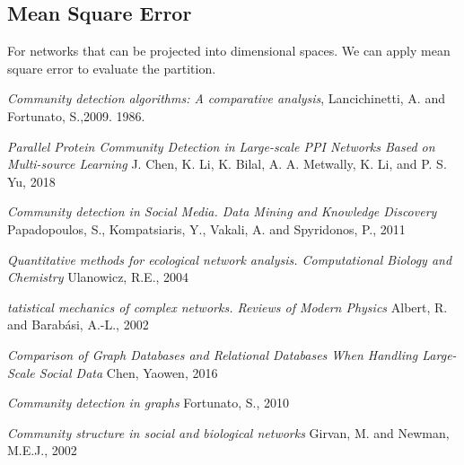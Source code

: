 \documentclass[12pt]{article}
\begin{document}
\subsection{Mean Square Error}
For networks that can be projected into dimensional spaces. We can apply mean square error to evaluate the partition.



\pagebreak
\begin{thebibliography}{100}

  
    \textit{Community detection algorithms: A comparative analysis},
    Lancichinetti, A. and Fortunato, S.,2009.
    1986.
  
    \textit{Parallel Protein Community Detection in
    Large-scale PPI Networks Based on
    Multi-source Learning}
    J. Chen, K. Li, K. Bilal, A. A. Metwally, K. Li, and P. S. Yu,
    2018
    
    \textit{Community detection in Social Media. Data Mining and Knowledge Discovery}
    Papadopoulos, S., Kompatsiaris, Y., Vakali, A. and Spyridonos, P.,
    2011
    
    \textit{Quantitative methods for ecological network analysis. Computational Biology and Chemistry}
    Ulanowicz, R.E.,
    2004
    
    \textit{tatistical mechanics of complex networks. Reviews of Modern Physics}
    Albert, R. and Barabási, A.-L.,
    2002
    
    \textit{Comparison of Graph Databases and Relational Databases When Handling Large-Scale Social Data}
    Chen, Yaowen,
    2016
    
    \textit{Community detection in graphs}
    Fortunato, S.,
    2010
    
    \textit{Community structure in social and biological networks}
    Girvan, M. and Newman, M.E.J.,
    2002



        
\end{thebibliography}
\end{document}
